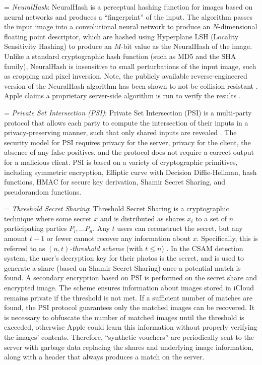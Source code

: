 \noindent
\hangindent=\parindent
\emph{NeuralHash}: NeuralHash is a perceptual hashing function for images based on neural networks and produces a ``fingerprint'' of the input. The algorithm passes the input image into a convolutional neural network to produce an $N$-dimensional floating point descriptor, which are hashed using Hyperplane LSH (Locality Sensitivity Hashing) to produce an $M$-bit value as the NeuralHash of the image. Unlike a standard cryptographic hash function (such as MD5 and the SHA family), NeuralHash is insensitive to small perturbations of the input image, such as cropping and pixel inversion. Note, the publicly available reverse-engineered version of the NeuralHash algorithm has been shown to not be collision resistant \cite{ygvarAppleNeuralHash2ONNX2021}. Apple claims a proprietary server-side algorithm is run to verify the results \cite{cox20201}.

\noindent
\hangindent=\parindent
\emph{Private Set Intersection (PSI)}: Private Set Intersection (PSI) is a multi-party protocol that allows each party to compute the intersection of their inputs in a privacy-preserving manner, such that only shared inputs are revealed \cite{kiss2017private}. The security model for PSI requires privacy for the server, privacy for the client, the absence of any false positives, and the protocol does not require a correct output for a malicious client. PSI is based on a variety of cryptographic primitives, including symmetric encryption, Elliptic curve with Decision Diffie-Hellman, hash functions, HMAC for secure key derivation, Shamir Secret Sharing, and pseudorandom functions.

\noindent
\hangindent=\parindent
\emph{Threshold Secret Sharing}: Threshold Secret Sharing is a cryptographic technique where some secret $x$ and is distributed as shares $x_i$ to a set of $n$ participating parties $P_i, \dots P_n$. Any $t$ users  can reconstruct the secret, but any amount $t-1$ or fewer cannot recover any information about $x$. Specifically, this is referred to as \emph{$(n,t)$-threshold scheme} (with $t \le n$) \cite{katz2014introduction}. In the CSAM detection system, the user's decryption key for their photos is the secret, and is used to generate a share (based on Shamir Secret Sharing) once a potential match is found. A secondary encryption based on PSI is performed on the secret share and encrypted image. The scheme ensures information about images stored in iCloud remains private if the threshold is not met. If a sufficient number of matches are found, the PSI protocol guarantees only the matched images can be recovered. 
It is necessary to obfuscate the number of matched images until the threshold is exceeded, otherwise Apple could learn this information without properly verifying the images' contents. Therefore, ``synthetic vouchers'' are periodically sent to the server with garbage data replacing the shares and underlying image information, along with a header that always produces a match on the server.

